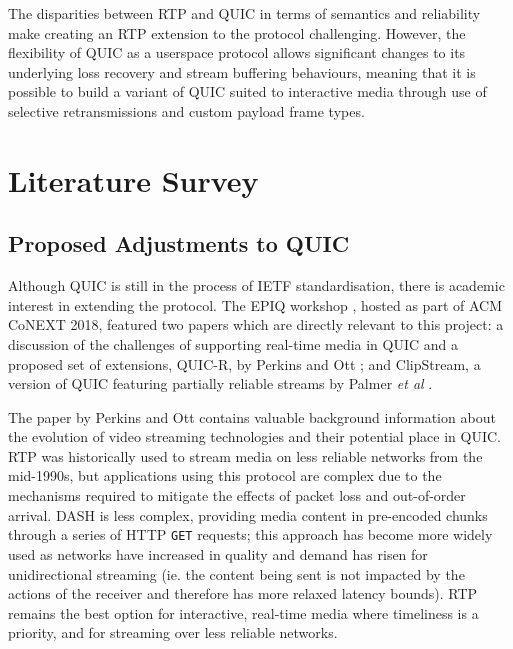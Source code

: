 \documentclass{mprop}
\begin{document}
The disparities between RTP and QUIC in terms of semantics and reliability make creating an RTP extension to the protocol challenging. However, the flexibility of QUIC as a userspace protocol allows significant changes to its underlying loss recovery and stream buffering behaviours, meaning that it is possible to build a variant of QUIC suited to interactive media through use of selective retransmissions and custom payload frame types.


\newpage

\section{Literature Survey}


\subsection{Proposed Adjustments to QUIC}

Although QUIC is still in the process of IETF standardisation, there is academic interest in extending the protocol. The EPIQ workshop \cite{epiq}, hosted as part of ACM CoNEXT 2018, featured two papers which are directly relevant to this project: a discussion of the challenges of supporting real-time media in QUIC and a proposed set of extensions, QUIC-R, by Perkins and Ott \cite{Perkins2018}; and ClipStream, a version of QUIC featuring partially reliable streams by Palmer \textit{et al} \cite{Palmer2018}.

The paper by Perkins and Ott contains valuable background information about the evolution of video streaming technologies and their potential place in QUIC. RTP was historically used to stream media on less reliable networks from the mid-1990s, but applications using this protocol are complex due to the mechanisms required to mitigate the effects of packet loss and out-of-order arrival. DASH is less complex, providing media content in pre-encoded chunks through a series of HTTP \texttt{GET} requests; this approach has become more widely used as networks have increased in quality and demand has risen for unidirectional streaming (ie. the content being sent is not impacted by the actions of the receiver and therefore has more relaxed latency bounds). RTP remains the best option for interactive, real-time media where timeliness is a priority, and for streaming over less reliable networks.
\end{document}
